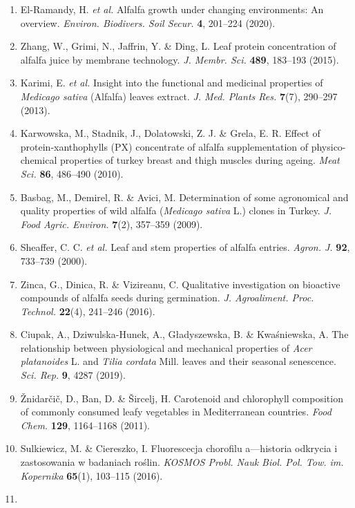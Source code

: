 \documentclass[
]{article}
\begin{document}
\begin{enumerate}
\def\labelenumi{\arabic{enumi}.}
\item
  El-Ramandy, H. \emph{et al.} Alfalfa growth under changing
  environments: An overview. \emph{Environ. Biodivers. Soil Secur.}
  \textbf{4}, 201--224 (2020).
\item
  Zhang, W., Grimi, N., Jaffrin, Y. \& Ding, L. Leaf protein
  concentration of alfalfa juice by membrane technology. \emph{J. Membr.
  Sci.} \textbf{489}, 183--193 (2015).
\item
  Karimi, E. \emph{et al.} Insight into the functional and medicinal
  properties of \emph{Medicago sativa} (Alfalfa) leaves extract.
  \emph{J. Med. Plants Res.} \textbf{7}(7), 290--297 (2013).
\item
  Karwowska, M., Stadnik, J., Dolatowski, Z. J. \& Grela, E. R. Effect
  of protein-xanthophylls (PX) concentrate of alfalfa supplementation of
  physico-chemical properties of turkey breast and thigh muscles during
  ageing. \emph{Meat Sci.} \textbf{86}, 486--490 (2010).
\item
  Basbag, M., Demirel, R. \& Avici, M. Determination of some agronomical
  and quality properties of wild alfalfa (\emph{Medicago sativa} L.)
  clones in Turkey. \emph{J. Food Agric. Environ.} \textbf{7}(2),
  357--359 (2009).
\item
  Sheaffer, C. C. \emph{et al.} Leaf and stem properties of alfalfa
  entries. \emph{Agron. J.} \textbf{92}, 733--739 (2000).
\item
  Zinca, G., Dinica, R. \& Vizireanu, C. Qualitative investigation on
  bioactive compounds of alfalfa seeds during germination. \emph{J.
  Agroaliment. Proc. Technol.} \textbf{22}(4), 241--246 (2016).
\item
  Ciupak, A., Dziwulska-Hunek, A., Gładyszewska, B. \& Kwaśniewska, A.
  The relationship between physiological and mechanical properties of
  \emph{Acer platanoides} L. and \emph{Tilia cordata} Mill. leaves and
  their seasonal senescence. \emph{Sci. Rep.} \textbf{9}, 4287 (2019).
\item
  Žnidarčič, D., Ban, D. \& Šircelj, H. Carotenoid and chlorophyll
  composition of commonly consumed leafy vegetables in Mediterranean
  countries. \emph{Food Chem.} \textbf{129}, 1164--1168 (2011).
\item
  Sulkiewicz, M. \& Ciereszko, I. Fluorescecja chorofilu a---historia
  odkrycia i zastosowania w badaniach roślin. \emph{KOSMOS Probl. Nauk
  Biol. Pol. Tow. im. Kopernika} \textbf{65}(1), 103--115 (2016).
\item

\end{enumerate}
\end{document}
